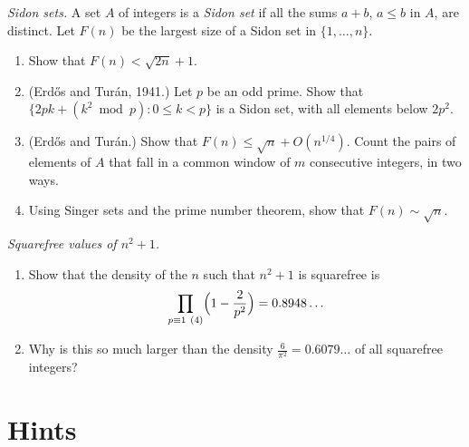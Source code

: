 \begin{exercise}[$\star\star$]\label{pb:sidon}
\emph{Sidon sets.} A set $A$ of integers is a \emph{Sidon set} if all the sums $a+b$, $a\le b$ in $A$, are distinct. Let $F(n)$
be the largest size of a Sidon set in $\{1,\dots,n\}$.
\begin{enumerate}[label=(\alph*)]
\item Show that $F(n)<\sqrt{2n}+1$.
\item (Erdős and Turán, 1941.) Let $p$ be an odd prime. Show that $\{2pk+(k^2\bmod p):0\le k<p\}$ is a Sidon set, with all elements
below $2p^2$.
\item (Erdős and Turán.) Show that $F(n)\le\sqrt n+O(n^{1/4})$. Count the pairs of elements of $A$ that fall in a common window
of $m$ consecutive integers, in two ways.
\item Using Singer sets and the prime number theorem, show that $F(n)\sim\sqrt n$.
\end{enumerate}
\end{exercise}

\begin{exercise}[$\star\star$]\label{pb:nsq1sqfree}
\emph{Squarefree values of $n^2+1$.}
\begin{enumerate}[label=(\alph*)]
\item Show that the density of the $n$ such that $n^2+1$ is squarefree is
\[
\prod_{p\equiv1\ (4)}\Bigl(1-\frac2{p^2}\Bigr)=0.8948\ldots
\]
\item Why is this so much larger than the density $\frac6{\pi^2}=0.6079\ldots$ of all squarefree integers?
\end{enumerate}
\end{exercise}

\section{Hints}

